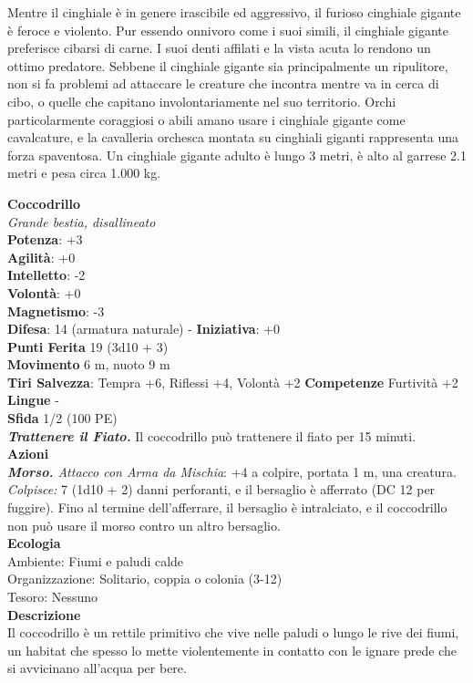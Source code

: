 \begin{multicols}{2}
Mentre il cinghiale è in genere irascibile ed aggressivo, il furioso cinghiale gigante è feroce e violento. Pur essendo onnivoro come i suoi simili, il cinghiale gigante preferisce cibarsi di carne. I suoi denti affilati e la vista acuta lo rendono un ottimo predatore. Sebbene il cinghiale gigante sia principalmente un ripulitore, non si fa problemi ad attaccare le creature che incontra mentre va in cerca di cibo, o quelle che capitano involontariamente nel suo territorio. Orchi particolarmente coraggiosi o abili amano usare i cinghiale gigante come cavalcature, e la cavalleria orchesca montata su cinghiali giganti rappresenta una forza spaventosa. Un cinghiale gigante adulto è lungo 3 metri, è alto al garrese 2.1 metri e pesa circa 1.000 kg.


\medskip\textbf{Coccodrillo}\\
\emph{Grande bestia, disallineato}\\
\textbf{Potenza}: +3\\
\textbf{Agilità}: +0\\
\textbf{Intelletto}: -2\\
\textbf{Volontà}: +0\\
\textbf{Magnetismo}: -3\\
\textbf{Difesa}: 14 (armatura naturale) - \textbf{Iniziativa}: +0\\
\textbf{Punti Ferita} 19 (3d10 + 3)\\
\textbf{Movimento} 6 m, nuoto 9 m\\
\textbf{Tiri Salvezza}: Tempra +6, Riflessi +4, Volontà +2 
\textbf{Competenze} Furtività +2\\
\textbf{Lingue} -\\
\textbf{Sfida} 1/2 (100 PE)\smallskip\\
\emph{\textbf{Trattenere il Fiato.}} Il coccodrillo può trattenere il fiato per 15 minuti.\\
\smallskip\textbf{Azioni}\\
\emph{\textbf{Morso.} Attacco con Arma da Mischia}: +4 a colpire, portata 1 m, una creatura.\\
\emph{Colpisce:} 7 (1d10 + 2) danni perforanti, e il bersaglio è afferrato (DC 12 per fuggire). Fino al termine dell'afferrare, il bersaglio è intralciato, e il coccodrillo non può usare il morso contro un altro bersaglio.\\
\textbf{Ecologia}\\
Ambiente: Fiumi e paludi calde\\
Organizzazione: Solitario, coppia o colonia (3-12)\\
Tesoro: Nessuno\\
\textbf{Descrizione}\\
Il coccodrillo è un rettile primitivo che vive nelle paludi o lungo le rive dei fiumi, un habitat che spesso lo mette violentemente in contatto con le ignare prede che si avvicinano all'acqua per bere.\\


\end{multicols}
